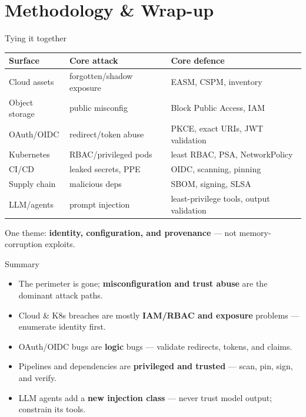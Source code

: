 \documentclass[aspectratio=169,11pt]{beamer}
\begin{document}
\section{Methodology \& Wrap-up}
\begin{frame}{Tying it together}
  \begin{table}\footnotesize
  \begin{tabular}{@{}p{3.4cm}p{4.0cm}p{4.0cm}@{}}\toprule
  \textbf{Surface} & \textbf{Core attack} & \textbf{Core defence} \\ \midrule
  Cloud assets & forgotten/shadow exposure & EASM, CSPM, inventory \\
  Object storage & public misconfig & Block Public Access, IAM \\
  OAuth/OIDC & redirect/token abuse & PKCE, exact URIs, JWT validation \\
  Kubernetes & RBAC/privileged pods & least RBAC, PSA, NetworkPolicy \\
  CI/CD & leaked secrets, PPE & OIDC, scanning, pinning \\
  Supply chain & malicious deps & SBOM, signing, SLSA \\
  LLM/agents & prompt injection & least-privilege tools, output validation \\
  \bottomrule\end{tabular}\end{table}
  \footnotesize One theme: \textbf{identity, configuration, and provenance} ---
  not memory-corruption exploits.
\end{frame}

\begin{frame}{Summary}
  \begin{itemize}
    \item The perimeter is gone; \textbf{misconfiguration and trust abuse} are
          the dominant attack paths.
    \item Cloud \& K8s breaches are mostly \textbf{IAM/RBAC and exposure}
          problems --- enumerate identity first.
    \item OAuth/OIDC bugs are \textbf{logic} bugs --- validate redirects, tokens,
          and claims.
    \item Pipelines and dependencies are \textbf{privileged and trusted} ---
          scan, pin, sign, and verify.
    \item LLM agents add a \textbf{new injection class} --- never trust model
          output; constrain its tools.
  \end{itemize}
\end{frame}
\end{document}
